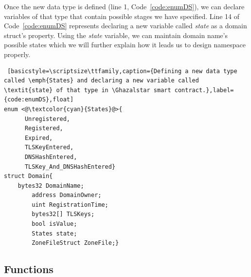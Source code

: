 Once the new data type is defined (line 1, Code~\ref{code:enumDS}), we can declare variables of that type that contain possible stages we have specified. Line 14 of Code~\ref{code:enumDS} represents declaring a new variable called \emph{state} as a domain struct's property. Using the \emph{state} variable, we can maintain domain name's possible states which we will further explain how it leads us to design \Ghazalstar namespace properly.



\begin{lstlisting} [basicstyle=\scriptsize\ttfamily,caption={Defining a new data type called \emph{States} and declaring a new variable called \textit{state} of that type in \Ghazalstar smart contract.},label={code:enumDS},float]
enum <@\textcolor{cyan}{States}@>{
	  Unregistered,
	  Registered,
	  Expired,
	  TLSKeyEntered,   
	  DNSHashEntered,
	  TLSKey_And_DNSHashEntered}
struct Domain{
    bytes32 DomainName;
        address DomainOwner;
        uint RegistrationTime;
        bytes32[] TLSKeys; 
        bool isValue; 
        States state; 
        ZoneFileStruct ZoneFile;}
\end{lstlisting}

\subsection{Functions}

